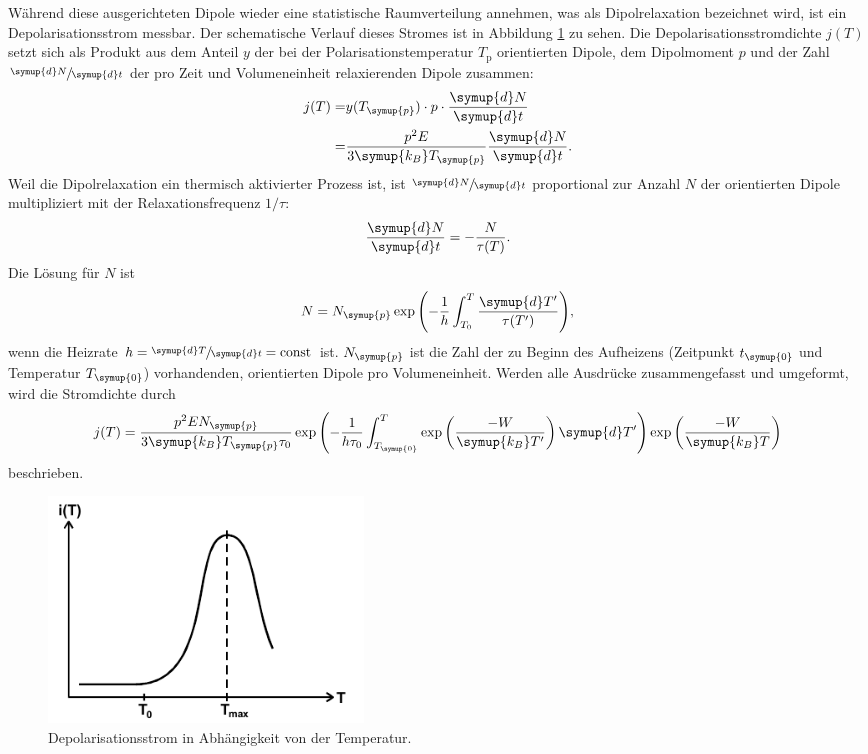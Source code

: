 Während diese ausgerichteten Dipole wieder eine statistische Raumverteilung annehmen, was als Dipolrelaxation bezeichnet wird, ist ein Depolarisationsstrom messbar.
Der schematische Verlauf dieses Stromes ist in Abbildung \ref{fig:Strom} zu sehen.
Die Depolarisationsstromdichte $j(T)$ setzt sich als Produkt aus dem Anteil $y$ der bei der Polarisationstemperatur $T_\text{p}$ orientierten Dipole, dem Dipolmoment $p$ und der Zahl $\sfrac{\symup{d}N}{\symup{d}t}$
der pro Zeit und Volumeneinheit relaxierenden Dipole zusammen:
\begin{equation}
    \begin{split}
        j(T) = & y(T_{\symup{p}}) \cdot p \cdot \frac{\symup{d}N}{\symup{d}t} \\
        = &\frac{p^2E}{3 \symup{k_B} T_{\symup{p}}} \frac{\symup{d}N}{\symup{d}t}.
    \end{split}
\end{equation}
Weil die Dipolrelaxation ein thermisch aktivierter Prozess ist, ist $\sfrac{\symup{d}N}{\symup{d}t}$ proportional zur Anzahl $N$ der orientierten Dipole multipliziert mit der Relaxationsfrequenz $1/\tau$:
\begin{equation*}
    \frac{\symup{d}N}{\symup{d}t}=-\frac{N}{\tau(T)}.
\end{equation*}
Die Lösung für $N$ ist
\begin{equation*}
    N=N_{\symup{p}} \exp{\left(-\frac{1}{h}\int_{T_0}^{T}\frac{\symup{d}T'}{\tau(T')}\right)},
\end{equation*}
wenn die Heizrate $h=\sfrac{\symup{d}T}{\symup{d}t}=\text{const}$ ist.
$N_{\symup{p}}$ ist die Zahl der zu Beginn des Aufheizens (Zeitpunkt $t_{\symup{0}}$ und Temperatur $T_{\symup{0}}$) vorhandenden, orientierten Dipole pro Volumeneinheit.
Werden alle Ausdrücke zusammengefasst und umgeformt, wird die Stromdichte durch
\begin{equation}
\label{eqn:Stromdichte}
    j(T)=\frac{p^2 E N_{\symup{p}}}{3 \symup{k_B} T_{\symup{p}}\tau_0}\exp\left(-\frac{1}{h\tau_0}\int_{T_{\symup{0}}}^{T}\exp\left(\frac{-W}{\symup{k_B}T'}\right)\symup{d}T'\right)\exp\left(\frac{-W}{\symup{k_B}T}\right)
\end{equation}
beschrieben.
\begin{figure}[htb]
    \centering
    \includegraphics[height=6cm]{pics/Strom.png}
    \caption{Depolarisationsstrom in Abhängigkeit von der Temperatur. \cite{anleitung}}
    \label{fig:Strom}
\end{figure}
